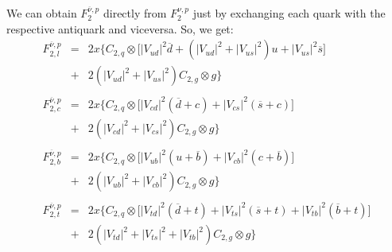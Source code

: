 \documentclass[10pt,a4paper]{article}
\begin{document}
We can obtain $F_2^{\overline\nu,p}$ directly from $F_2^{\nu,p}$ just
by exchanging each quark with the respective antiquark and
viceversa. So, we get:
\begin{equation}
\begin{array}{rcl}  
F_{2,l}^{\overline\nu,p} &=& 2x\Big\{C_{2,q}\otimes\Big[|V_{ud}|^2\overline{d}+\left(|V_{ud}|^2+|V_{us}|^2\right)u + |V_{us}|^2 \overline{s}\Big]\\
                &+& 2\left(|V_{ud}|^2+|V_{us}|^2\right)C_{2,g}\otimes g\Big\}\\
\\
F_{2,c}^{\overline\nu,p} &=& 2x\Big\{C_{2,q}\otimes\Big[|V_{cd}|^2(\overline{d}+c) + |V_{cs}|^2 (\overline{s}+c)\Big]\\
                &+& 2\left(|V_{cd}|^2+|V_{cs}|^2\right)C_{2,g}\otimes g\Big\}\\
\\
F_{2,b}^{\overline\nu,p} &=& 2x\Big\{C_{2,q}\otimes\Big[|V_{ub}|^2 (u+\overline{b}) + |V_{cb}|^2 (c+\overline{b})\Big]\\
                &+& 2\left(|V_{ub}|^2+|V_{cb}|^2\right)C_{2,g}\otimes g\Big\}\\
\\
F_{2,t}^{\overline\nu,p} &=& 2x\Big\{C_{2,q}\otimes\Big[|V_{td}|^2 (\overline{d} +t)+ |V_{ts}|^2(\overline{s}+t) + |V_{tb}|^2(\overline{b}+t)\Big]\\
                &+& 2\left(|V_{td}|^2 + |V_{ts}|^2 + |V_{tb}|^2\right)C_{2,g}\otimes g\Big\}
\end{array}
\end{equation}
\end{document}
